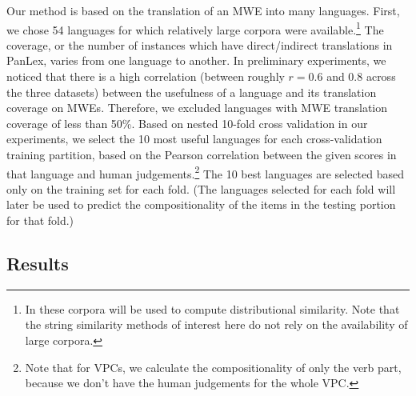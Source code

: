 \documentclass[output=paper
,modfonts
,nonflat]{langsci/langscibook}
\begin{document}
Our method is based on the translation of an MWE into many
languages. First, we chose 54 languages for which
relatively large corpora were available.\footnote{In
   these corpora will be used to compute
  distributional similarity. Note that the string similarity methods of interest here do not rely on the
  availability of large corpora.} The coverage, or the number of
instances which have direct/indirect translations in PanLex, varies
from one language to another. In preliminary experiments, we noticed
that there is a high correlation (between roughly $r = 0.6$ and 0.8 across
the three datasets) between the usefulness of a language and its
translation coverage on MWEs. Therefore, we excluded languages with
MWE translation coverage of less than 50\%. Based on nested 10-fold
cross validation in our experiments, we select the 10 most useful
languages for each cross-validation training partition, based on the
Pearson correlation between the given scores in that language and
human judgements.\footnote{Note that for VPCs, we calculate the
  compositionality of only the verb part, because we don't have the
  human judgements for the whole VPC.}  The 10 best languages are
selected based only on the training set for each fold. (The languages
selected for each fold will later be used to predict the
compositionality of the items in the testing portion for that fold.)




\subsection{Results\label{sec:ss:results}}
\end{document}
